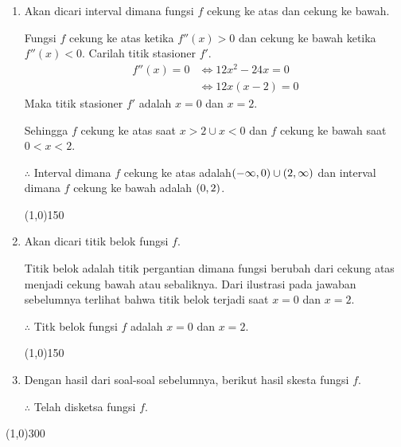 \begin{enumerate}[leftmargin=*, label={\arabic*}.]
\begin{enumerate}[label={\alph*}.]
    \item Akan dicari interval dimana fungsi $f$ cekung ke atas dan cekung ke bawah.
    
    Fungsi $f$ cekung ke atas ketika $f''(x) > 0$ dan cekung ke bawah ketika $f''(x)<0.$
    Carilah titik stasioner $f'$.
    \begin{align*}
        f''(x)=0 &\iff 12x^{2}-24x=0\\
        &\iff 12x(x-2) = 0
    \end{align*}
    Maka titik stasioner $f'$ adalah $x=0$ dan $x=2$.

    
    
    Sehingga $f$ cekung ke atas saat $x > 2 \cup x < 0$ dan $f$ cekung ke bawah saat 
    $0 < x < 2$.

    $\therefore$ Interval dimana $f$ cekung ke atas adalah$(-\infty,0)\cup(2,\infty)$ 
    dan interval dimana $f$ cekung ke bawah adalah $(0,2)$.


\begin{center}\line(1,0){150}\end{center}


    \item Akan dicari titik belok fungsi $f$.
    
    Titik belok adalah titik pergantian dimana fungsi berubah dari cekung atas menjadi cekung bawah 
    atau sebaliknya. Dari ilustrasi pada jawaban sebelumnya terlihat bahwa titik belok terjadi saat 
    $x=0$ dan $x=2$.

    $\therefore$ Titk belok fungsi $f$ adalah $x=0$ dan $x=2$.


\begin{center}\line(1,0){150}\end{center}


    \item Dengan hasil dari soal-soal sebelumnya, berikut hasil skesta fungsi $f$.
    
    

    $\therefore$ Telah disketsa fungsi $f$.

    \end{enumerate}
\end{enumerate}

\begin{center}\line(1,0){300}\end{center}
